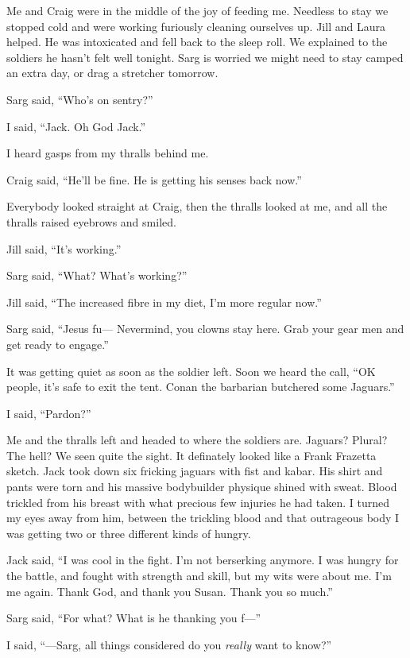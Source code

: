 Me and Craig were in the middle of the joy of feeding me. Needless to stay we stopped cold and were working furiously cleaning ourselves up. Jill and Laura helped. He was intoxicated and fell back to the sleep roll. We explained to the soldiers he hasn't felt well tonight. Sarg is worried we might need to stay camped an extra day, or drag a stretcher tomorrow.

Sarg said, ``Who's on sentry?''

I said, ``Jack. Oh God Jack.''

I heard gasps from my thralls behind me.

Craig said, ``He'll be fine. He is getting his senses back now.''

Everybody looked straight at Craig, then the thralls looked at me, and all the thralls raised eyebrows and smiled.

Jill said, ``It's working.''

Sarg said, ``What? What's working?''

Jill said, ``The increased fibre in my diet, I'm more regular now.''

Sarg said, ``Jesus fu--- Nevermind, you clowns stay here. Grab your gear men and get ready to engage.''

It was getting quiet as soon as the soldier left. Soon we heard the call, ``OK people, it's safe to exit the tent. Conan the barbarian butchered some Jaguars.''

I said, ``Pardon?''

Me and the thralls left and headed to where the soldiers are. Jaguars? Plural? The hell? We seen quite the sight. It definately looked like a Frank Frazetta sketch. Jack took down six fricking jaguars with fist and kabar. His shirt and pants were torn and his massive bodybuilder physique shined with sweat. Blood trickled from his breast with what precious few injuries he had taken. I turned my eyes away from him, between the trickling blood and that outrageous body I was getting two or three different kinds of hungry.

Jack said, ``I was cool in the fight. I'm not berserking anymore. I was hungry for the battle, and fought with strength and skill, but my wits were about me. I'm me again. Thank God, and thank you Susan. Thank you so much.''

Sarg said, ``For what? What is he thanking you f---''

I said, ``---Sarg, all things considered do you \textit{really} want to know?''

